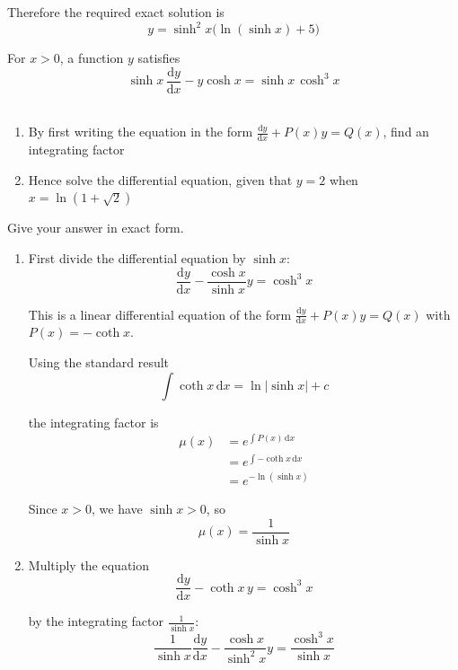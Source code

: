 \documentclass[leqno]{article}
\begin{document}
\begin{enumerate}[
  label=\textbf{\arabic*.},
  leftmargin=*,
  topsep=0pt,
  partopsep=0pt,
  parsep=0pt
]
\begin{djsSolution}
Therefore the required exact solution is
\[
y=\sinh^2 x\bigl(\ln(\sinh x)+5\bigr)
\]
\end{djsSolution}


\newpage

\questionitem

For $x>0$, a function $y$ satisfies \\
\[
\sinh x\,\frac{\mathrm{d}y}{\mathrm{d}x}-y\cosh x=\sinh x\,\cosh^3 x
\] \\
\begin{enumerate}[label=\textbf{(\alph*)}]
  \item By first writing the equation in the form $\frac{\mathrm{d}y}{\mathrm{d}x}+P(x)y=Q(x)$, find an integrating factor  \\
  \item Hence solve the differential equation, given that $y=2$ when $x=\ln(1+\sqrt{2})$  \\
\end{enumerate}
Give your answer in exact form.

\vspace*{10pt}

\begin{djsSolution}
\begin{enumerate}[label=\textbf{(\alph*)}]
  \item First divide the differential equation by \(\sinh x\):
\[
\frac{\mathrm{d}y}{\mathrm{d}x}-\frac{\cosh x}{\sinh x}y=\cosh^3 x
\]

This is a linear differential equation of the form \(\frac{\mathrm{d}y}{\mathrm{d}x}+P(x)y=Q(x)\) with \(P(x)=-\coth x\).

Using the standard result
\[
\int \coth x\,\mathrm{d}x=\ln|\sinh x|+c
\]

the integrating factor is
\begin{align*}
\mu(x)
&=e^{\int P(x)\,\mathrm{d}x} \\
&=e^{\int -\coth x\,\mathrm{d}x} \\
&=e^{-\ln(\sinh x)}
\end{align*}

Since \(x>0\), we have \(\sinh x>0\), so
\[
\mu(x)=\frac{1}{\sinh x}
\]

  \item Multiply the equation
\[
\frac{\mathrm{d}y}{\mathrm{d}x}-\coth x\,y=\cosh^3 x
\]

by the integrating factor \(\frac{1}{\sinh x}\):
\[
\frac{1}{\sinh x}\frac{\mathrm{d}y}{\mathrm{d}x}-\frac{\cosh x}{\sinh^2 x}y=\frac{\cosh^3 x}{\sinh x}
\]


\end{enumerate}
\end{djsSolution}
\end{enumerate}
\end{document}
